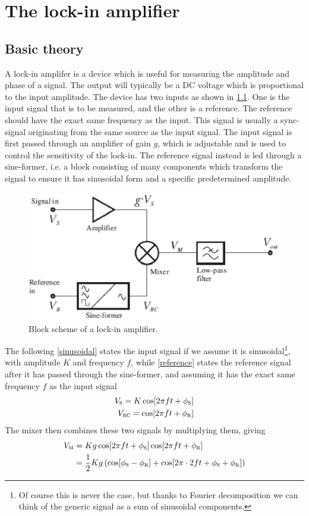 \chapter{The lock-in amplifier}\label{lokkin}
	\section{Basic theory}
A lock-in amplifer is a device which is useful for measuring the amplitude and phase of a signal. The output will typically be a DC voltage which is proportional to the input amplitude. The device has two inputs as shown in \cref{lockin1}. One is the input signal that is to be measured, and the other is a reference. The reference should have the exact same frequency as the input. This signal is usually a sync-signal originating from the same source as the input signal. The input signal is first passed through an amplifier of gain $g$, which is adjustable and is used to control the sensitivity of the lock-in. The reference signal instead is led through a sine-former, i.e.  a block consisting of many components which transform the signal to ensure it has sinusoidal form and a specific predetermined amplitude.

\begin{figure}[!hbt]\centering
\includegraphics[width=\linewidth, draft=\foto]{eps/lockin1.eps}
\caption{Block scheme of a lock-in amplifier.}
\label{lockin1}
\end{figure}

The following \cref{sinusoidal} states the input signal if we assume it is sinusoidal\footnote{Of course this is never the case, but thanks to Fourier decomposition we can think of the generic signal as a sum of sinusoidal components.}, with amplitude $K$ and frequency $f$, while \cref{reference} states the reference signal after it has passed through the sine-former, and assuming it has the exact same frequency $f$ as the input signal
\begin{align}
V_{\mbox{\footnotesize{\scshape{s}}}}=K\cos[2\pi ft+\phi_{\mbox{\footnotesize{\scshape{s}}}}]
\label{sinusoidal}\\
V_{\mbox{\footnotesize{\scshape{rc}}}}=\cos[2\pi ft+\phi_{\mbox{\footnotesize{\scshape{r}}}}]
\label{reference}
\end{align}
The mixer then combines these two signals by multiplying them, giving
\begin{align}
V_{\mbox{\footnotesize{\scshape{m}}}}&=Kg\cos[2\pi ft+\phi_{\mbox{\footnotesize{\scshape{s}}}}]\cos[2\pi ft+\phi_{\mbox{\footnotesize{\scshape{r}}}}]\nonumber\\
&=\frac{1}{2}Kg\left(\cos[\phi_{\mbox{\footnotesize{\scshape{s}}}}-\phi_{\mbox{\footnotesize{\scshape{r}}}}]+\cos[2\pi\cdot2ft+\phi_{\mbox{\footnotesize{\scshape{s}}}}+\phi_{\mbox{\footnotesize{\scshape{r}}}}]\right)\label{mixer}
\end{align}


